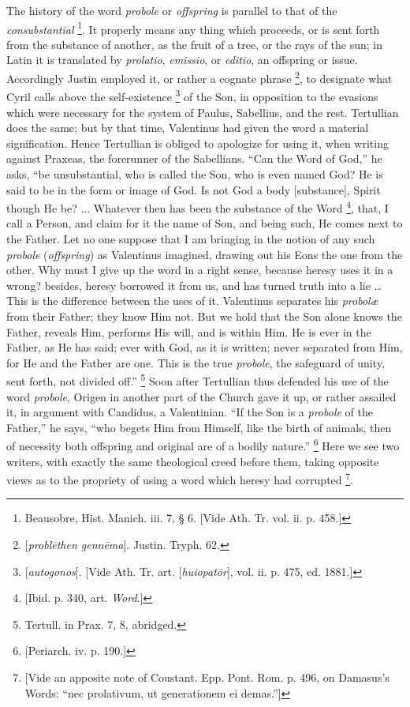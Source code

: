 The history of the word \emph{probole} or \emph{offspring} is
parallel to that of the \emph{consubstantial} \footnote{Beausobre, Hist. Manich. iii. 7, § 6.
[Vide Ath. Tr. vol. ii. p. 458.]}. It properly means any thing which proceeds, or is sent forth
from the substance of another, as the fruit of a tree, or the rays of
the sun; in Latin it is translated by \emph{prolatio}, \emph{emissio},
or \emph{editio}, an offspring or issue. Accordingly Justin employed
it, or rather a cognate phrase \footnote{[\emph{probl\={e}then genn\={e}ma}].
Justin. Tryph. 62.}, to designate what Cyril calls above the self-existence \footnote{[\emph{autogonos}]. [Vide Ath. Tr. art. [\emph{huiopat\={o}r}],
vol. ii. p. 475, ed. 1881.]} of the Son, in opposition to the evasions which were necessary
for the system of Paulus, Sabellius, and the rest. Tertullian does the
same; but by that time, Valentinus had given the word a material
signification. Hence Tertullian is obliged to apologize for using it,
when writing against Praxeas, the forerunner of the Sabellians.
``Can the Word of God,'' he asks, ``be unsubstantial, who
is called the Son, who is even named God? He is said to be in the form
or image of God. Is not God a body [substance], Spirit though He be?
... Whatever then has been the substance of the Word \footnote{[Ibid. p. 340, art. \emph{Word}.]}, that, I call a Person, and claim for it the name of Son, and
being such, He comes next to the Father. Let no one suppose that I am
bringing in the notion of any such \emph{probole} (\emph{offspring})
as Valentinus imagined, drawing out his Eons the one from the other.
Why must I give up the word in a right sense, because heresy uses it
in a wrong? besides, heresy borrowed it from us, and has turned truth
into a lie … This is the difference between the uses of it.
Valentinus separates his \emph{probolæ} from their Father; they know
Him not. But we hold that the Son alone knows the Father, reveals Him,
performs His will, and is within Him. He is ever in the Father, as He
has said; ever with God, as it is written; never separated from Him,
for He and the Father are one. This is the true \emph{probole}, the
safeguard of unity, sent forth, not divided off.'' \footnote{Tertull. in Prax. 7, 8, abridged.} Soon after Tertullian thus defended his use of the word \emph{probole},
Origen in another part of the Church gave it up, or rather assailed
it, in argument with Candidus, a Valentinian. ``If the Son is a \emph{probole}
of the Father,'' he says, ``who begets Him from Himself, like
the birth of animals, then of necessity both offspring and original
are of a bodily nature.'' \footnote{[Periarch. iv. p. 190.]} Here we see two writers, with exactly the same theological
creed before them, taking opposite views as to the propriety of using
a word which heresy had corrupted \footnote{[Vide an apposite note of Coustant. Epp.
Pont. Rom. p. 496, on Damasus's Words: ``nec prolativum, ut
generationem ei demas.'']}.

